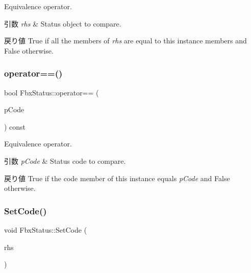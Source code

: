 Equivalence operator. 
\begin{DoxyParams}{引数}
{\em rhs} & Status object to compare. \\
\hline
\end{DoxyParams}
\begin{DoxyReturn}{戻り値}
{\ttfamily True} if all the members of {\itshape rhs} are equal to this instance members and {\ttfamily False} otherwise. 
\end{DoxyReturn}
\mbox{\label{class_fbx_status_aaee475035201b4873ce60261e8a92072}} 
\subsubsection{\texorpdfstring{operator==()}{operator==()}\hspace{0.1cm}{\footnotesize\ttfamily [2/2]}}
{\footnotesize\ttfamily bool Fbx\+Status\+::operator== (\begin{DoxyParamCaption}\item[{const \hyperlink{class_fbx_status_a6a631d5d95b28e31a19aabd5f5809ecc}{E\+Status\+Code}}]{p\+Code }\end{DoxyParamCaption}) const}

Equivalence operator. 
\begin{DoxyParams}{引数}
{\em p\+Code} & Status code to compare. \\
\hline
\end{DoxyParams}
\begin{DoxyReturn}{戻り値}
{\ttfamily True} if the code member of this instance equals {\itshape p\+Code} and {\ttfamily False} otherwise. 
\end{DoxyReturn}
\mbox{\label{class_fbx_status_a906fe62e4753eb13571c359daf07cbf3}} 
\subsubsection{\texorpdfstring{Set\+Code()}{SetCode()}\hspace{0.1cm}{\footnotesize\ttfamily [1/2]}}
{\footnotesize\ttfamily void Fbx\+Status\+::\+Set\+Code (\begin{DoxyParamCaption}\item[{const \hyperlink{class_fbx_status_a6a631d5d95b28e31a19aabd5f5809ecc}{E\+Status\+Code}}]{rhs }\end{DoxyParamCaption})}

